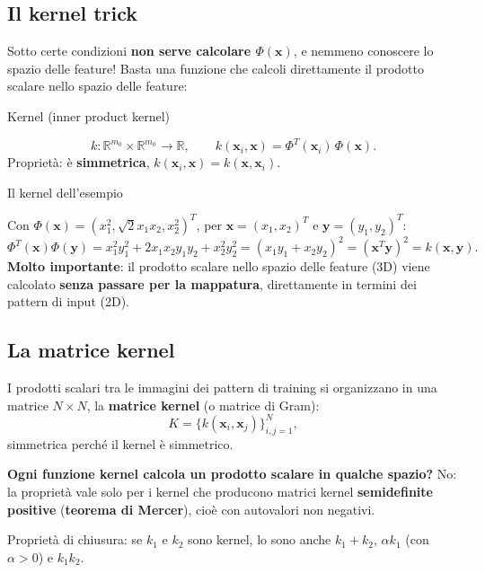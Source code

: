 \subsection{Il kernel trick}\label{il-kernel-trick}

Sotto certe condizioni \textbf{non serve calcolare
\(\Phi(\mathbf{x})\)}, e nemmeno conoscere lo spazio delle feature!
Basta una funzione che calcoli direttamente il prodotto scalare nello
spazio delle feature:

\begin{boxdefinition}{Kernel (inner product kernel)}

\[
k: \mathbb{R}^{m_0} \times \mathbb{R}^{m_0} \to \mathbb{R}, \qquad k(\mathbf{x}_i, \mathbf{x}) = \Phi^T(\mathbf{x}_i)\,\Phi(\mathbf{x}).
\] Proprietà: è \textbf{simmetrica},
\(k(\mathbf{x}_i, \mathbf{x}) = k(\mathbf{x}, \mathbf{x}_i)\).

\end{boxdefinition}

\begin{boxexample}{Il kernel dell'esempio}

Con \(\Phi(\mathbf{x}) = (x_1^2, \sqrt{2}x_1x_2, x_2^2)^T\), per
\(\mathbf{x} = (x_1, x_2)^T\) e \(\mathbf{y} = (y_1, y_2)^T\): \[
\Phi^T(\mathbf{x})\Phi(\mathbf{y}) = x_1^2y_1^2 + 2x_1x_2y_1y_2 + x_2^2y_2^2 = (x_1y_1 + x_2y_2)^2 = (\mathbf{x}^T\mathbf{y})^2 = k(\mathbf{x}, \mathbf{y}).
\] \textbf{Molto importante}: il prodotto scalare nello spazio delle
feature (3D) viene calcolato \textbf{senza passare per la mappatura},
direttamente in termini dei pattern di input (2D).

\end{boxexample}

\subsection{La matrice kernel}\label{la-matrice-kernel}

I prodotti scalari tra le immagini dei pattern di training si
organizzano in una matrice \(N \times N\), la \textbf{matrice kernel} (o
matrice di Gram): \[
K = \{k(\mathbf{x}_i, \mathbf{x}_j)\}_{i,j=1}^N,
\] simmetrica perché il kernel è simmetrico.

\textbf{Ogni funzione kernel calcola un prodotto scalare in qualche
spazio?} No: la proprietà vale solo per i kernel che producono matrici
kernel \textbf{semidefinite positive} (\textbf{teorema di Mercer}), cioè
con autovalori non negativi.

Proprietà di chiusura: se \(k_1\) e \(k_2\) sono kernel, lo sono anche
\(k_1 + k_2\), \(\alpha k_1\) (con \(\alpha > 0\)) e \(k_1 k_2\).

